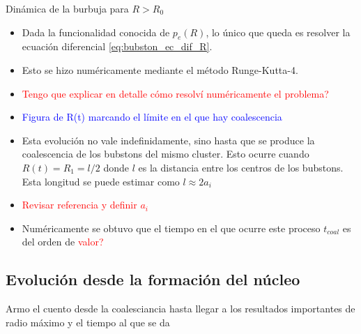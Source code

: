 \documentclass[aps,prb,twocolumn,superscriptaddress,floatfix,longbibliography,10pt]{revtex4-2}
\newcounter{para}
\begin{document}
Dinámica de la burbuja para $R>R_0$
\begin{itemize}
  \item Dada la funcionalidad conocida de $p_e(R)$, lo único que queda es resolver la ecuación diferencial \ref{eq:bubston_ec_dif_R}.
  \item Esto se hizo numéricamente mediante el método Runge-Kutta-4.
  \item \textcolor{red}{Tengo que explicar en detalle cómo resolví numéricamente el problema?}
  \item \textcolor{blue}{Figura de R(t) marcando el límite en el que hay coalescencia}
  \item Esta evolución no vale indefinidamente, sino hasta que se produce la coalescencia de los bubstons del mismo cluster. Esto ocurre cuando $R(t) = R_1=l/2$ donde $l$ es la distancia entre los centros de los bubstons. Esta longitud se puede estimar como $l \approx 2a_i$
  \item \textcolor{red}{Revisar referencia y definir $a_i$}
  \item Numéricamente se obtuvo que el tiempo en el que ocurre este proceso $t_{coal}$ es del orden de \textcolor{red}{valor?}
\end{itemize}

\subsection{Evolución desde la formación del núcleo}

Armo el cuento desde la coalesciancia hasta llegar a los resultados importantes de radio máximo y el tiempo al que se da
\end{document}
